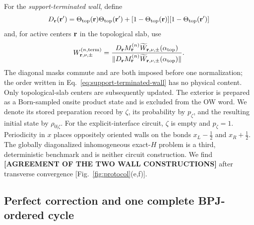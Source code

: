 \documentclass[aps,prx,twocolumn,superscriptaddress,longbibliography,nofootinbib,floatfix]{revtex4-2}
\newcommand{\bfr}{{\bf r}}
\newcommand{\ResultValue}[1]{\textcolor{BrickRed}{\textbf{[#1]}}}
\begin{document}
For the \emph{support-terminated wall}, define
\begin{equation}
 D_{\bfr}(\bfr')=
 \Theta_{\rm top}(\bfr)\Theta_{\rm top}(\bfr')
 +[1-\Theta_{\rm top}(\bfr)][1-\Theta_{\rm top}(\bfr')]
 \label{eq:same-region-mask}
\end{equation}
and, for active centers \(\bfr\) in the topological slab, use
\begin{equation}
 W^{(n,{\rm term})}_{\bfr,\nu,\pm}
 =
 \frac{D_{\bfr}M_{\bfr}^{(n)}
 \widetilde W_{\bfr,\nu,\pm}(\alpha_{\rm top})}
 {\|D_{\bfr}M_{\bfr}^{(n)}
 \widetilde W_{\bfr,\nu,\pm}(\alpha_{\rm top})\|}.
 \label{eq:support-terminated-wall}
\end{equation}
The diagonal masks commute and are both imposed before one normalization; the
order written in Eq.~\eqref{eq:support-terminated-wall} has no physical
content.  Only topological-slab centers are subsequently updated.  The
exterior is prepared as a Born-sampled onsite product state and is excluded
from the OW word.  We denote its stored preparation record by \(\zeta\), its
probability by \(p_\zeta\), and the resulting initial state by
\(\rho_{0|\zeta}\).  For the explicit-interface circuit, \(\zeta\) is empty
and \(p_\zeta=1\).  Periodicity in \(x\) places oppositely oriented walls on
the bonds \(x_L-\tfrac12\) and \(x_R+\tfrac12\).  The globally diagonalized
inhomogeneous exact-\(H\) problem is a third, deterministic benchmark and is
neither circuit construction.  We find
\ResultValue{AGREEMENT OF THE TWO WALL CONSTRUCTIONS} after transverse
convergence [Fig.~\ref{fig:protocol}(e,f)].

\subsection{Perfect correction and one complete BPJ-ordered cycle}
\end{document}
